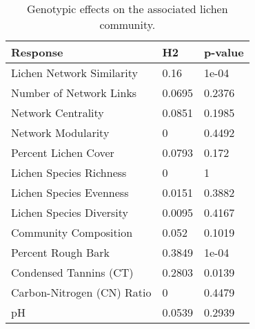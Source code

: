 \begin{table}[ht]
\centering
\begin{tabular}{lll}
  \hline
Response & H2 & p-value \\ 
  \hline
Lichen Network Similarity & 0.16 & 1e-04 \\ 
  Number of Network Links & 0.0695 & 0.2376 \\ 
  Network Centrality & 0.0851 & 0.1985 \\ 
  Network Modularity & 0 & 0.4492 \\ 
  Percent Lichen Cover & 0.0793 & 0.172 \\ 
  Lichen Species Richness & 0 & 1 \\ 
  Lichen Species Evenness & 0.0151 & 0.3882 \\ 
  Lichen Species Diversity & 0.0095 & 0.4167 \\ 
  Community Composition & 0.052 & 0.1019 \\ 
  Percent Rough Bark & 0.3849 & 1e-04 \\ 
  Condensed Tannins (CT) & 0.2803 & 0.0139 \\ 
  Carbon-Nitrogen (CN) Ratio & 0 & 0.4479 \\ 
  pH & 0.0539 & 0.2939 \\ 
   \hline
\end{tabular}
\caption{Genotypic effects on the associated lichen community.} 
\label{tab:h2_table}
\end{table}
